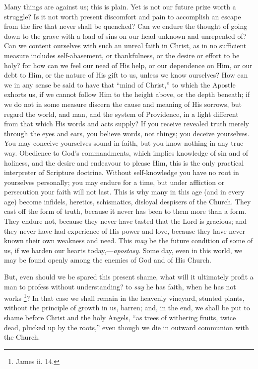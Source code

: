 Many things are against us; this is plain. Yet is not
our future prize worth a struggle? Is it not worth
present discomfort and pain to accomplish an escape from
the fire that never shall be quenched? Can we endure the
thought of going down to the grave with a load of sins on
our head unknown and unrepented of? Can we content
ourselves with such an unreal faith in Christ, as in no
sufficient measure includes self-abasement, or
thankfulness, or the desire or effort to be holy? for how
can we feel our need of His help, or our dependence on
Him, or our debt to Him, or the nature of His gift to us,
unless we know ourselves? How can we in any sense be said
to have that ``mind of Christ,'' to which the
Apostle exhorts us, if we cannot follow Him to the height
above, or the depth beneath; if we do not in some measure
discern the cause and meaning of His sorrows, but regard
the world, and man, and the system of Providence, in a
light different from that which His words and acts
supply? If you receive revealed truth merely through the
eyes and ears, you believe words, not things; you deceive
yourselves. You may conceive yourselves sound in faith,
but you know nothing in any true way. Obedience to God's commandments, which implies knowledge of sin and of
holiness, and the desire and endeavour to please Him,
this is the only practical interpreter of Scripture
doctrine. Without self-knowledge you have no root in
yourselves personally; you may endure for a time, but
under affliction or persecution your faith will not last.
This is why many in this age (and in every age) become
infidels, heretics, schismatics, disloyal despisers of
the Church. They cast off the form of truth, because it
never has been to them more than a form. They endure not,
because they never have tasted that the Lord is gracious;
and they never have had experience of His power and love,
because they have never known their own weakness and
need. This \emph{may} be the future condition of some
of us, if we harden our hearts today,—\emph{apostasy}.
Some day, even in this world, we may be found openly
among the enemies of God and of His Church.

But, even should we be spared this present shame, what
will it ultimately profit a man to profess without
understanding? to \emph{say} he has faith, when he has
not works \footnote{James ii. 14.}? In that case we shall remain
in the heavenly vineyard, stunted plants, without the
principle of growth in us, barren; and, in the end, we
shall be put to shame before Christ and the holy Angels,
``as trees of withering fruits, twice dead, plucked
up by the roots,'' even though we die in outward
communion with the Church.


